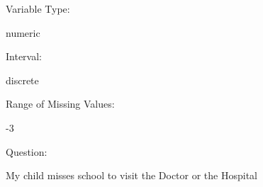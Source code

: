 \documentclass[
]{article}
\begin{document}
\begin{minipage}[t]{0.3\linewidth}

Variable Type:

\end{minipage}%
\begin{minipage}[t]{0.7\linewidth}

numeric

\end{minipage}

\begin{minipage}[t]{0.3\linewidth}

Interval:

\end{minipage}%
\begin{minipage}[t]{0.7\linewidth}

discrete

\end{minipage}

\begin{minipage}[t]{0.3\linewidth}

Range of Missing Values:

\end{minipage}%
\begin{minipage}[t]{0.7\linewidth}

-3

\end{minipage}

\begin{minipage}[t]{0.3\linewidth}

Question:

\end{minipage}%
\begin{minipage}[t]{0.7\linewidth}

My child misses school to visit the Doctor or the Hospital

\end{minipage}
\end{document}
